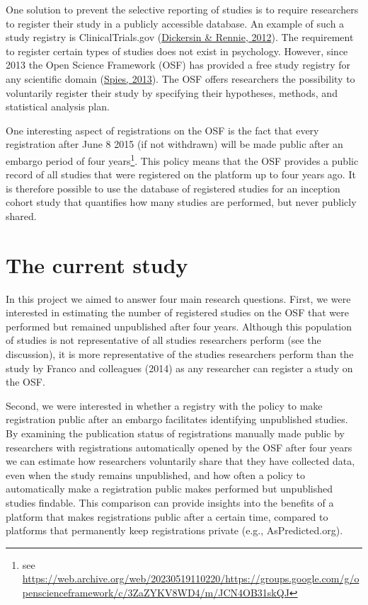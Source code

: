 \documentclass[
  ,jou, a4paper,floatsintext]{apa6}
\begin{document}
One solution to prevent the selective reporting of studies is to require researchers to register their study in a publicly accessible database. An example of such a study registry is ClinicalTrials.gov (\protect\hyperlink{ref-dickersin_evolution_2012}{Dickersin \& Rennie, 2012}). The requirement to register certain types of studies does not exist in psychology. However, since 2013 the Open Science Framework (OSF) has provided a free study registry for any scientific domain (\protect\hyperlink{ref-spies_open_2013}{Spies, 2013}). The OSF offers researchers the possibility to voluntarily register their study by specifying their hypotheses, methods, and statistical analysis plan.

One interesting aspect of registrations on the OSF is the fact that every registration after June 8 2015 (if not withdrawn) will be made public after an embargo period of four years\footnote{see \url{https://web.archive.org/web/20230519110220/https://groups.google.com/g/openscienceframework/c/3ZaZYKV8WD4/m/JCN4OB31skQJ}}. This policy means that the OSF provides a public record of all studies that were registered on the platform up to four years ago. It is therefore possible to use the database of registered studies for an inception cohort study that quantifies how many studies are performed, but never publicly shared.

\hypertarget{the-current-study}{%
\section{The current study}\label{the-current-study}}

In this project we aimed to answer four main research questions. First, we were interested in estimating the number of registered studies on the OSF that were performed but remained unpublished after four years. Although this population of studies is not representative of all studies researchers perform (see the discussion), it is more representative of the studies researchers perform than the study by Franco and colleagues (2014) as any researcher can register a study on the OSF.

Second, we were interested in whether a registry with the policy to make registration public after an embargo facilitates identifying unpublished studies. By examining the publication status of registrations manually made public by researchers with registrations automatically opened by the OSF after four years we can estimate how researchers voluntarily share that they have collected data, even when the study remains unpublished, and how often a policy to automatically make a registration public makes performed but unpublished studies findable. This comparison can provide insights into the benefits of a platform that makes registrations public after a certain time, compared to platforms that permanently keep registrations private (e.g., AsPredicted.org).
\end{document}
